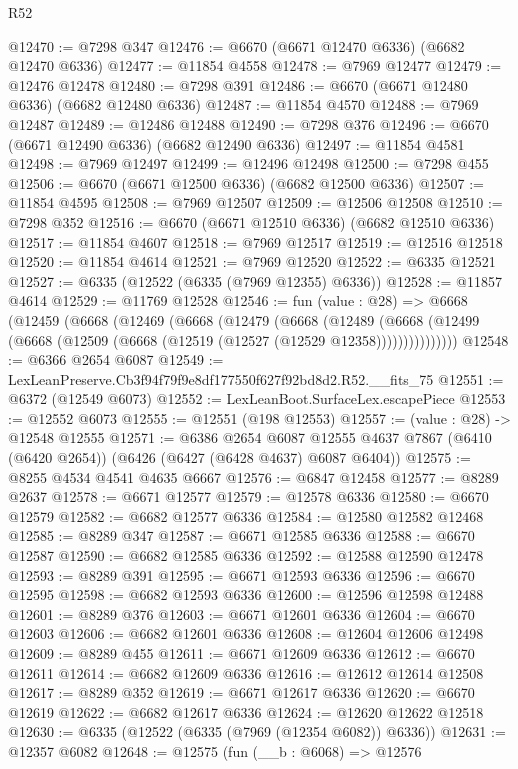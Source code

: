 \begin{lexlean}{R52}
\begin{coremodule}
@12470 := @7298 @347
@12476 := @6670 (@6671 @12470 @6336) (@6682 @12470 @6336)
@12477 := @11854 @4558
@12478 := @7969 @12477
@12479 := @12476 @12478
@12480 := @7298 @391
@12486 := @6670 (@6671 @12480 @6336) (@6682 @12480 @6336)
@12487 := @11854 @4570
@12488 := @7969 @12487
@12489 := @12486 @12488
@12490 := @7298 @376
@12496 := @6670 (@6671 @12490 @6336) (@6682 @12490 @6336)
@12497 := @11854 @4581
@12498 := @7969 @12497
@12499 := @12496 @12498
@12500 := @7298 @455
@12506 := @6670 (@6671 @12500 @6336) (@6682 @12500 @6336)
@12507 := @11854 @4595
@12508 := @7969 @12507
@12509 := @12506 @12508
@12510 := @7298 @352
@12516 := @6670 (@6671 @12510 @6336) (@6682 @12510 @6336)
@12517 := @11854 @4607
@12518 := @7969 @12517
@12519 := @12516 @12518
@12520 := @11854 @4614
@12521 := @7969 @12520
@12522 := @6335 @12521
@12527 := @6335 (@12522 (@6335 (@7969 @12355) @6336))
@12528 := @11857 @4614
@12529 := @11769 @12528
@12546 := fun (value : @28) =>
  @6668
    (@12459
      (@6668
        (@12469
          (@6668
            (@12479
              (@6668
                (@12489
                  (@6668 (@12499 (@6668 (@12509 (@6668 (@12519 (@12527 (@12529 @12358)))))))))))))))
@12548 := @6366 @2654 @6087
@12549 := LexLeanPreserve.Cb3f94f79f9e8df177550f627f92bd8d2.R52.__fits_75
@12551 := @6372 (@12549 @6073)
@12552 := LexLeanBoot.SurfaceLex.escapePiece
@12553 := @12552 @6073
@12555 := @12551 (@198 @12553)
@12557 := (value : @28) -> @12548 @12555
@12571 := @6386
    @2654
    @6087
    @12555
    @4637
    @7867
    (@6410 (@6420 @2654))
    (@6426 (@6427 (@6428 @4637) @6087 @6404))
@12575 := @8255 @4534 @4541 @4635 @6667
@12576 := @6847 @12458
@12577 := @8289 @2637
@12578 := @6671 @12577
@12579 := @12578 @6336
@12580 := @6670 @12579
@12582 := @6682 @12577 @6336
@12584 := @12580 @12582 @12468
@12585 := @8289 @347
@12587 := @6671 @12585 @6336
@12588 := @6670 @12587
@12590 := @6682 @12585 @6336
@12592 := @12588 @12590 @12478
@12593 := @8289 @391
@12595 := @6671 @12593 @6336
@12596 := @6670 @12595
@12598 := @6682 @12593 @6336
@12600 := @12596 @12598 @12488
@12601 := @8289 @376
@12603 := @6671 @12601 @6336
@12604 := @6670 @12603
@12606 := @6682 @12601 @6336
@12608 := @12604 @12606 @12498
@12609 := @8289 @455
@12611 := @6671 @12609 @6336
@12612 := @6670 @12611
@12614 := @6682 @12609 @6336
@12616 := @12612 @12614 @12508
@12617 := @8289 @352
@12619 := @6671 @12617 @6336
@12620 := @6670 @12619
@12622 := @6682 @12617 @6336
@12624 := @12620 @12622 @12518
@12630 := @6335 (@12522 (@6335 (@7969 (@12354 @6082)) @6336))
@12631 := @12357 @6082
@12648 := @12575
    (fun (__b : @6068) =>
    @12576

\end{coremodule}
\end{lexlean}
